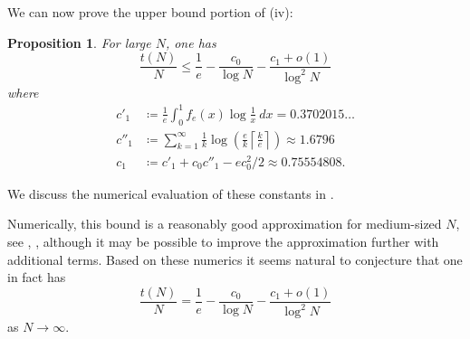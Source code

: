 \documentclass[12pt,a4paper,reqno]{amsart}
\numberwithin{equation}{section}
\theoremstyle{plain}
\newtheorem{proposition}[theorem]{Proposition}
\theoremstyle{definition}
\begin{document}
We can now prove the upper bound portion of (iv):

  \begin{proposition}\label{upper-bound}  For large $N$, one has
    $$ \frac{t(N)}{N} \leq \frac{1}{e} - \frac{c_0}{\log N} - \frac{c_1 + o(1)}{\log^2 N}$$
    where
    \begin{align}
      c'_1 &\coloneqq \frac{1}{e} \int_0^1 f_e(x) \log \frac{1}{x}\ dx = 0.3702015\dots \label{c1p-def}\\
      c''_1 &\coloneqq \sum_{k=1}^\infty \frac{1}{k}  \log\left( \frac{e}{k} \left\lceil \frac{k}{e} \right\rceil \right) \approx 1.6796\label{c1pp-def}\\
      c_1 &\coloneqq c'_1 + c_0 c''_1 - ec_0^2/2 \approx 0.75554808.\label{c1-def}
    \end{align}
  \end{proposition}

We discuss the numerical evaluation of these constants in .

  Numerically, this bound is a reasonably good approximation for medium-sized $N$, see , , although it may be possible to improve the approximation further with additional terms.  Based on these numerics it seems natural to conjecture that one in fact has
  $$\frac{t(N)}{N} = \frac{1}{e} - \frac{c_0}{\log N} - \frac{c_1 + o(1)}{\log^2 N}$$
as $N \to \infty$.
    
\end{document}
